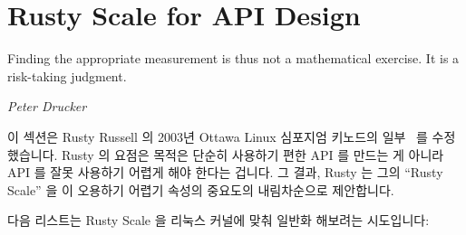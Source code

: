 \section{Rusty Scale for API Design}
\label{sec:easy:Rusty Scale for API Design}
%
\epigraph{Finding the appropriate measurement is thus not a mathematical
	  exercise.  It is a risk-taking judgment.}
	 {\emph{Peter Drucker}}

이 섹션은 Rusty Russell 의 2003년 Ottawa Linux 심포지엄 키노드의
일부~\cite[Slides~39--57]{RustyRussell2003OLSkeynote} 를 수정했습니다.
Rusty 의 요점은 목적은 단순히 사용하기 편한 API 를 만드는 게 아니라 API 를 잘못
사용하기 어렵게 해야 한다는 겁니다.
그 결과, Rusty 는 그의 ``Rusty Scale'' 을 이 오용하기 어렵기 속성의 중요도의
내림차순으로 제안합니다.

다음 리스트는 Rusty Scale 을 리눅스 커널에 맞춰 일반화 해보려는 시도입니다:

